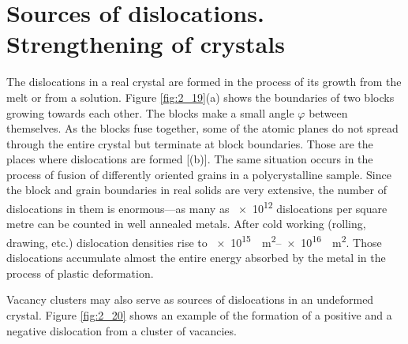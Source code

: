 \section{Sources of dislocations. Strengthening of crystals}\label{sec:19}

The dislocations in a real crystal are formed in the process of its growth from the melt or from a solution. Figure \ref{fig:2_19}(a) shows the boundaries of two blocks growing towards each other. The blocks make a small angle $\varphi$ between themselves. As the blocks fuse together, some of the atomic planes do not spread through the entire crystal but terminate at block boundaries. Those are the places where dislocations are formed [(b)]. The same situation occurs in the process of fusion of differently oriented grains in a polycrystalline sample. Since the block and grain boundaries in real solids are very extensive, the number of dislocations in them is enormous---as many as \num{e12} dislocations per square metre can be counted in well annealed metals. After cold working (rolling, drawing, etc.) dislocation densities rise to \SIrange{e15}{e16}{\per\metre\squared}. Those dislocations accumulate almost the entire energy absorbed by the metal in the process of plastic deformation.

Vacancy clusters may also serve as sources of dislocations in an undeformed crystal. Figure \ref{fig:2_20} shows an example of the formation of a positive and a negative dislocation from a cluster of vacancies.

